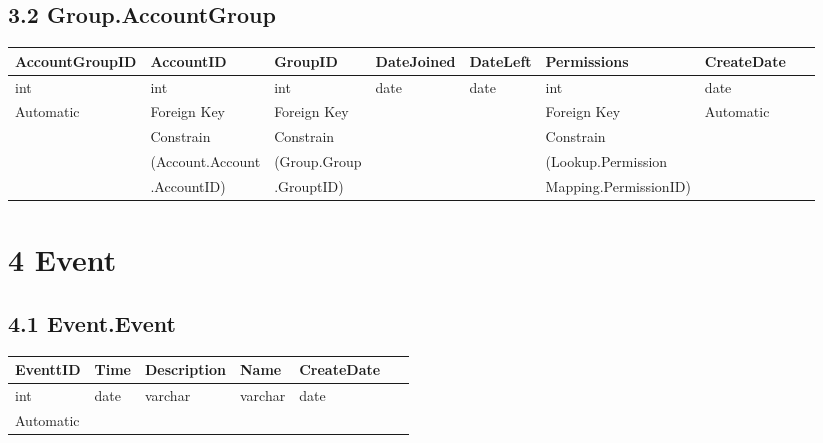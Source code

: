 \documentclass[12pt,fleqn]{article}
\begin{document}
\subsection*{3.2 Group.AccountGroup }
\begin{table}[!ht]
\centering
\footnotesize
\label{DB changes}
    \begin{tabular}{|l|l|l|l|l|l|l|l|} 
        \hline
        AccountGroupID & AccountID & GroupID & DateJoined & DateLeft & Permissions & CreateDate & ~\\ \hline
        int & int & int & date & date & int & date & ~\\ \hline
        Automatic & Foreign Key & Foreign Key & ~ & ~  & Foreign Key  & Automatic & ~ \\
        ~ & Constrain & Constrain & ~ & ~  & Constrain & ~ & ~ \\  
        ~ &  (Account.Account & (Group.Group & ~ & ~ & (Lookup.Permission & ~ & ~ \\ 
        ~ &  .AccountID) & .GrouptID) & ~ & ~ & Mapping.PermissionID) & ~ & ~ \\ 
        \hline    
    \end{tabular}
\end{table}
\FloatBarrier
\newpage
\section* {4 Event}
\subsection*{4.1 Event.Event }
\begin{table}[htbp]
\centering
\footnotesize
\label{DB changes}
    \begin{tabular}{|l|l|l|l|l|l|}
        \hline
         EventtID & Time & Description & Name &  CreateDate & ~\\ \hline
         int & date & varchar & varchar &  date & ~\\ \hline
         Automatic & ~ & ~ & ~ &  ~ & ~ \\ 
        \hline
    \end{tabular}
\end{table}
\FloatBarrier
\end{document}
